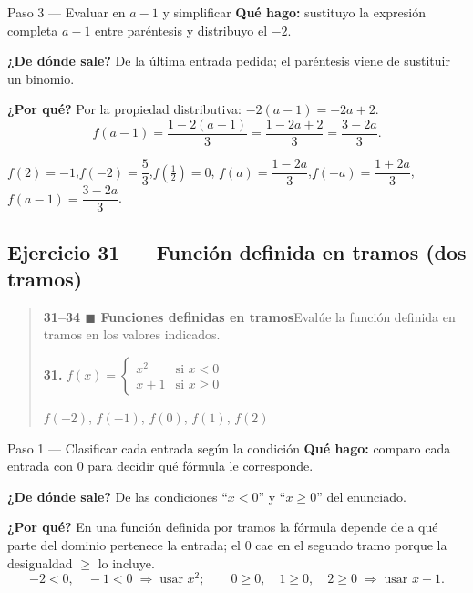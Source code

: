 \documentclass[11pt]{article}
\begin{document}
\begin{paso}{Paso 3 --- Evaluar en $a-1$ y simplificar}
\textbf{Qué hago:} sustituyo la expresión completa $a-1$ entre paréntesis y distribuyo el $-2$.

\textbf{¿De dónde sale?} De la última entrada pedida; el paréntesis viene de sustituir un binomio.

\textbf{¿Por qué?} Por la propiedad distributiva: $-2(a-1)=-2a+2$.
\[
f(a-1)=\frac{1-2(a-1)}{3}=\frac{1-2a+2}{3}=\frac{3-2a}{3}.
\]
\end{paso}

\begin{resp}
$f(2)=-1$,\quad $f(-2)=\dfrac53$,\quad $f\!\left(\tfrac12\right)=0$,\quad
$f(a)=\dfrac{1-2a}{3}$,\quad $f(-a)=\dfrac{1+2a}{3}$,\quad $f(a-1)=\dfrac{3-2a}{3}$.
\end{resp}

\subsection*{Ejercicio 31 — Función definida en tramos (dos tramos)}

\begin{quote}
\textbf{31--34 $\blacksquare$ Funciones definidas en tramos}\quad Evalúe la función definida en tramos en los valores indicados.

\textbf{31.} $f(x)=\begin{cases} x^2 & \text{si } x<0\\ x+1 & \text{si } x\ge 0\end{cases}$

\qquad $f(-2)$, $f(-1)$, $f(0)$, $f(1)$, $f(2)$
\end{quote}

\begin{paso}{Paso 1 --- Clasificar cada entrada según la condición}
\textbf{Qué hago:} comparo cada entrada con $0$ para decidir qué fórmula le corresponde.

\textbf{¿De dónde sale?} De las condiciones ``$x<0$'' y ``$x\ge0$'' del enunciado.

\textbf{¿Por qué?} En una función definida por tramos la fórmula depende de a qué parte del dominio pertenece la entrada; el $0$ cae en el segundo tramo porque la desigualdad $\ge$ lo incluye.
\[
-2<0,\quad -1<0 \;\Rightarrow\; \text{usar } x^2;\qquad
0\ge0,\quad 1\ge0,\quad 2\ge0 \;\Rightarrow\; \text{usar } x+1.
\]
\end{paso}
\end{document}
